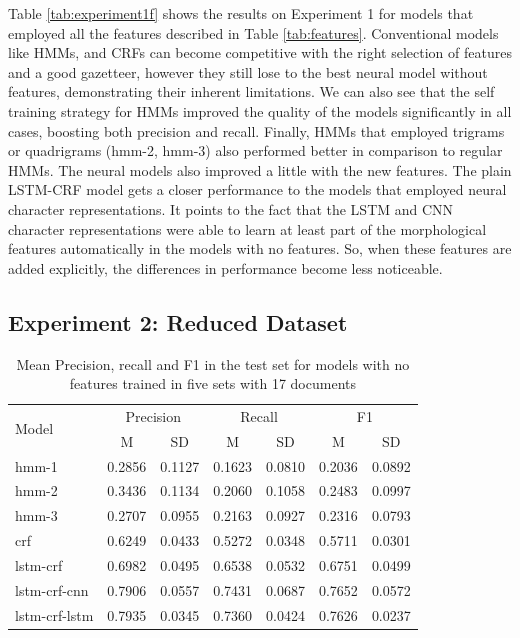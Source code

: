 \documentclass[sigconf]{acmart}
\begin{document}
Table \ref{tab:experiment1f} shows the results on Experiment 1 for models
that employed all the features described in Table \ref{tab:features}.
Conventional models like HMMs, and CRFs can become competitive with
the right selection of features and a good gazetteer, however they still lose
to the best neural model without features, demonstrating their inherent limitations.
We can also see that the self training strategy for HMMs improved the quality of 
the models significantly in all cases, boosting both precision and recall. Finally,
HMMs that employed trigrams or quadrigrams (hmm-2, hmm-3) also performed better in
comparison to regular HMMs.
The neural models also improved a little with the new features. The plain LSTM-CRF
model gets a closer performance to the models that employed neural character 
representations. It points to the fact that the LSTM and CNN character representations 
were able to learn at least part of the morphological features automatically in the
models with no features. So, when these features are added explicitly, the differences 
in performance become less noticeable.

\subsection{Experiment 2: Reduced Dataset}

\begin{table}[h]
  \small
  \begin{center}
    \begin{tabular}{ lllllll }
      \toprule
      \multirow{2}{*}{Model} & \multicolumn{2}{c}{Precision} & \multicolumn{2}{c}{Recall} & \multicolumn{2}{c}{F1} \\
                             & \multicolumn{1}{c}{\tiny{M}} & \multicolumn{1}{c}{\tiny{SD}}
			     & \multicolumn{1}{c}{\tiny{M}} & \multicolumn{1}{c}{\tiny{SD}}
			     & \multicolumn{1}{c}{\tiny{M}} & \multicolumn{1}{c}{\tiny{SD}} \\
      \midrule
      hmm-1	      & 0.2856 & 0.1127 & 0.1623 & 0.0810 & 0.2036 & 0.0892 \\
      hmm-2	      & 0.3436 & 0.1134 & 0.2060 & 0.1058 & 0.2483 & 0.0997 \\
      hmm-3	      & 0.2707 & 0.0955 & 0.2163 & 0.0927 & 0.2316 & 0.0793 \\
      crf	      & 0.6249 & 0.0433 & 0.5272 & 0.0348 & 0.5711 & 0.0301 \\
      lstm-crf	      & 0.6982 & 0.0495 & 0.6538 & 0.0532 & 0.6751 & 0.0499 \\
      lstm-crf-cnn    & 0.7906 & 0.0557 & 0.7431 & 0.0687 & 0.7652 & 0.0572 \\
      lstm-crf-lstm   & 0.7935 & 0.0345 & 0.7360 & 0.0424 & 0.7626 & 0.0237 \\
      \bottomrule
    \end{tabular}
  \end{center}
  \caption{Mean Precision, recall and F1 in the test set for models with no features
   trained in five sets with 17 documents}
  \label{tab:experiment2}
\end{table}
\end{document}
